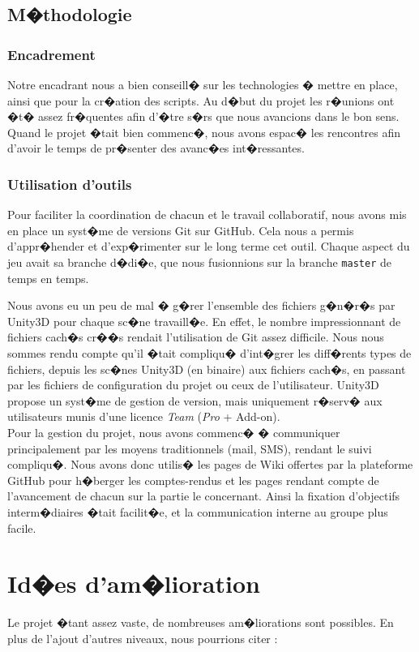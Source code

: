 \documentclass[a4paper,11pt]{article}
\begin{document}
\subsection{M�thodologie}
\subsubsection{Encadrement}
Notre encadrant nous a bien conseill� sur les technologies � mettre en place, ainsi que pour la cr�ation des scripts. Au d�but du projet les r�unions ont �t� assez fr�quentes afin d'�tre s�rs que nous avancions dans le bon sens. Quand le projet �tait bien commenc�, nous avons espac� les rencontres afin d'avoir le temps de pr�senter des avanc�es int�ressantes. 

\subsubsection{Utilisation d'outils}
Pour faciliter la coordination de chacun et le travail collaboratif, nous avons mis en place un syst�me de versions Git sur GitHub. Cela nous a permis d'appr�hender et d'exp�rimenter sur le long terme cet outil. Chaque aspect du jeu avait sa branche d�di�e, que nous fusionnions sur la branche \texttt{master} de temps en temps. 

Nous avons eu un peu de mal � g�rer l'ensemble des fichiers g�n�r�s par Unity3D pour chaque sc�ne travaill�e. En effet, le nombre impressionnant de fichiers cach�s cr��s rendait l'utilisation de Git assez difficile. Nous nous sommes rendu compte qu'il �tait compliqu� d'int�grer les diff�rents types de fichiers, depuis les sc�nes Unity3D (en binaire) aux fichiers cach�s, en passant par les fichiers de configuration du projet ou ceux de l'utilisateur. Unity3D propose un syst�me de gestion de version, mais uniquement r�serv� aux utilisateurs munis d'une licence \textit{Team} (\textit{Pro} + Add-on). \\


Pour la gestion du projet, nous avons commenc� � communiquer principalement par les moyens traditionnels (mail, SMS), rendant le suivi compliqu�. Nous avons donc utilis� les pages de Wiki offertes par la plateforme GitHub pour h�berger les comptes-rendus et les pages rendant compte de l'avancement de chacun sur la partie le concernant. Ainsi la fixation d'objectifs interm�diaires �tait facilit�e, et la communication interne au groupe plus facile.  


\section{Id�es d'am�lioration}
Le projet �tant assez vaste, de nombreuses am�liorations sont possibles. En plus de l'ajout d'autres niveaux, nous pourrions citer : 
\end{document}
